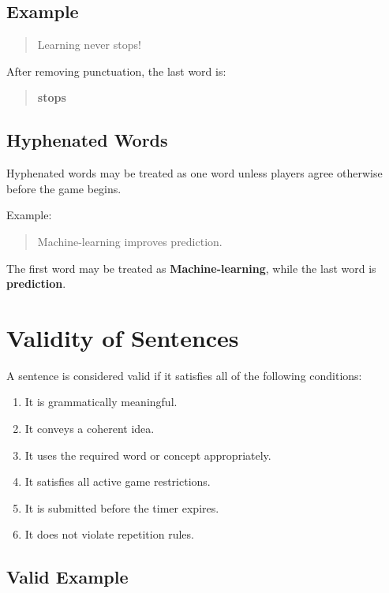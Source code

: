 \documentclass[11pt,a4paper]{article}
\begin{document}
\subsection{Example}

\begin{quote}
Learning never stops!
\end{quote}

After removing punctuation, the last word is:

\begin{quote}
\textbf{stops}
\end{quote}

\subsection{Hyphenated Words}

Hyphenated words may be treated as one word unless players agree otherwise before the game begins.

Example:

\begin{quote}
Machine-learning improves prediction.
\end{quote}

The first word may be treated as \textbf{Machine-learning}, while the last word is \textbf{prediction}.

\section{Validity of Sentences}

A sentence is considered valid if it satisfies all of the following conditions:

\begin{enumerate}
    \item It is grammatically meaningful.
    \item It conveys a coherent idea.
    \item It uses the required word or concept appropriately.
    \item It satisfies all active game restrictions.
    \item It is submitted before the timer expires.
    \item It does not violate repetition rules.
\end{enumerate}

\subsection{Valid Example}
\end{document}
